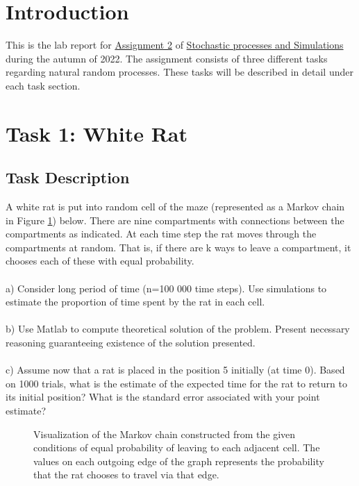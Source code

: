 \tableofcontents
\newpage
\section*{Introduction}
This is the lab report for \href{https://www.canvas.umu.se/courses/6705/assignments/75609}{Assignment 2} of \href{https://www.umu.se/en/education/courses/stochastic-processes-and-simulation/}{Stochastic processes and Simulations} during the autumn of 2022. The assignment consists of three different tasks regarding natural random processes. These tasks will be described in detail under each task section.

\section{Task 1: White Rat}
\label{sec:task1}

\subsection{Task Description}
\label{sec:desc1}
A white rat is put into random cell of the maze (represented as a Markov chain in Figure \ref{fig:ratchain}) below. There are nine compartments with connections between the compartments as indicated. At each time step the rat moves through the compartments at random. That is, if there are k ways to leave a compartment, it chooses each of these with equal probability. 
\\
\\a) Consider long period of time (n=100 000 time steps). Use simulations to estimate the proportion of
time spent by the rat in each cell.
\\
\\b) Use Matlab to compute theoretical solution of the problem. Present necessary reasoning guaranteeing existence of the solution presented.
\\
\\c) Assume now that a rat is placed in the position 5 initially (at time 0). Based on 1000 trials, what is
the estimate of the expected time for the rat to return to its initial position? What is the standard error associated with your point estimate?

\begin{figure}[H]
    \centering
    \markovchain{}
    \caption{Visualization of the Markov chain constructed from the given conditions of equal probability of leaving to each adjacent cell. The values on each outgoing edge of the graph represents the probability that the rat chooses to travel via that edge.}
    \label{fig:ratchain}
\end{figure}



